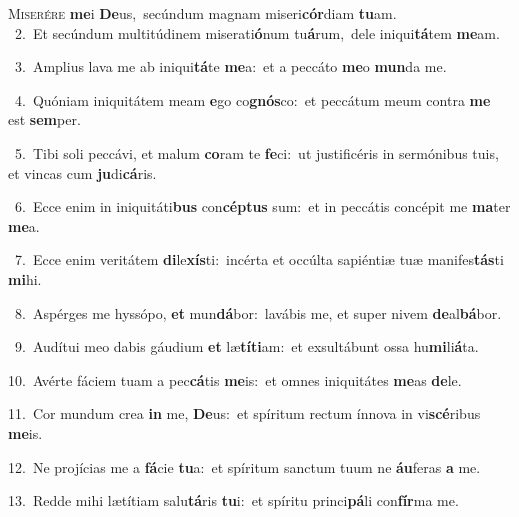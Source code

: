 \lettrine{\initial\textcolor{\initialcolor}{M}}{iserére} \textbf{me}\-i \textbf{De}\-us,~\star secúndum magnam miseri\-\textbf{cór}\-diam \textbf{tu}\-am.\\
{\numbfont\textcolor{\numbcolor}{~2.}}~Et secúndum multitúdinem miserati\-\textbf{ó}\-num tu\-\textbf{á}\-rum,~\star dele iniqui\-\textbf{tá}\-tem \textbf{me}\-am.\par
{\numbfont\textcolor{\numbcolor}{~3.}}~Amplius lava me ab iniqui\-\textbf{tá}\-te \textbf{me}\-a:~\star et a peccáto \textbf{me}\-o \textbf{mun}\-da me.\par
{\numbfont\textcolor{\numbcolor}{~4.}}~Quóniam iniquitátem meam \textbf{e}\-go co\-\textbf{gnós}\-co:~\star et peccátum meum contra \textbf{me} est \textbf{sem}\-per.\par
{\numbfont\textcolor{\numbcolor}{~5.}}~Tibi soli peccávi, et malum \textbf{co}\-ram te \textbf{fe}\-ci:~\star ut justificéris in sermónibus tuis, et vincas cum \textbf{ju}\-di\-\textbf{cá}\-ris.\par
{\numbfont\textcolor{\numbcolor}{~6.}}~Ecce enim in iniquitáti\textbf{bus} con\-\textbf{cép}\-\textbf{tus} sum:~\star et in peccátis concépit me \textbf{ma}\-ter \textbf{me}\-a.\par
{\numbfont\textcolor{\numbcolor}{~7.}}~Ecce enim veritátem \textbf{di}\-le\-\textbf{xís}\-ti:~\star incérta et occúlta sapiéntiæ tuæ manifes\-\textbf{tás}\-ti \textbf{mi}\-hi.\par
{\numbfont\textcolor{\numbcolor}{~8.}}~Aspérges me hyssópo, \textbf{et} mun\-\textbf{dá}\-bor:~\star lavábis me, et super nivem \textbf{de}\-al\-\textbf{bá}\-bor.\par
{\numbfont\textcolor{\numbcolor}{~9.}}~Audítui meo dabis gáudium \textbf{et} læ\-\textbf{tí}\-\textbf{ti}am:~\star et exsultábunt ossa hu\-\textbf{mi}\-li\-\textbf{á}\-ta.\par
{\numbfont\textcolor{\numbcolor}{10.}}~Avérte fáciem tuam a pec\-\textbf{cá}\-tis \textbf{me}\-is:~\star et omnes iniquitátes \textbf{me}\-as \textbf{de}\-le.\par
{\numbfont\textcolor{\numbcolor}{11.}}~Cor mundum crea \textbf{in} me, \textbf{De}\-us:~\star et spíritum rectum ínnova in vi\-\textbf{scé}\-ribus \textbf{me}\-is.\par
{\numbfont\textcolor{\numbcolor}{12.}}~Ne projícias me a \textbf{fá}\-cie \textbf{tu}\-a:~\star et spíritum sanctum tuum ne \textbf{áu}\-feras \textbf{a} me.\par
{\numbfont\textcolor{\numbcolor}{13.}}~Redde mihi lætítiam salu\-\textbf{tá}\-ris \textbf{tu}\-i:~\star et spíritu princi\-\textbf{pá}\-li con\-\textbf{fír}\-ma me.\par
